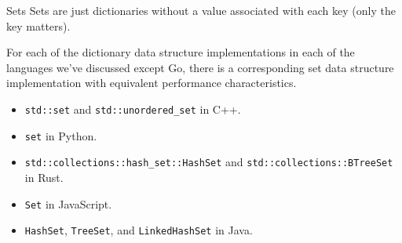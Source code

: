 \documentclass{algo}
\begin{document}
\begin{frame}{Sets}
    Sets are just dictionaries without a value associated with each key (only
    the key matters).

    For each of the dictionary data structure implementations in each of the
    languages we've discussed except Go, there is a corresponding set data
    structure implementation with equivalent performance characteristics.
    \pause

    \begin{itemize}
        \item \texttt{std::set} and \texttt{std::unordered\_set} in C++.
        \item \texttt{set} in Python.
        \item \texttt{std::collections::hash\_set::HashSet} and
            \texttt{std::collections::BTreeSet} in Rust.
        \item \texttt{Set} in JavaScript.
        \item \texttt{HashSet}, \texttt{TreeSet}, and \texttt{LinkedHashSet} in
            Java.
    \end{itemize}
\end{frame}
\end{document}
